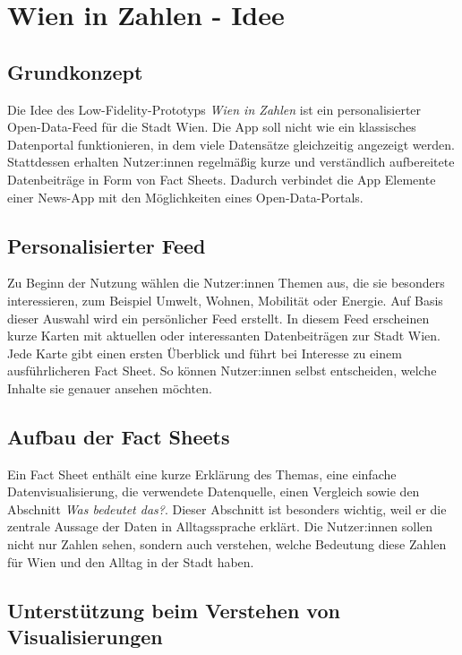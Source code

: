 \section{Wien in Zahlen - Idee}

\subsection{Grundkonzept}

Die Idee des Low-Fidelity-Prototyps \textit{Wien in Zahlen} ist ein personalisierter Open-Data-Feed für die Stadt Wien. Die App soll nicht wie ein klassisches Datenportal funktionieren, in dem viele Datensätze gleichzeitig angezeigt werden. Stattdessen erhalten Nutzer:innen regelmäßig kurze und verständlich aufbereitete Datenbeiträge in Form von Fact Sheets. Dadurch verbindet die App Elemente einer News-App mit den Möglichkeiten eines Open-Data-Portals.

\subsection{Personalisierter Feed}

Zu Beginn der Nutzung wählen die Nutzer:innen Themen aus, die sie besonders interessieren, zum Beispiel Umwelt, Wohnen, Mobilität oder Energie. Auf Basis dieser Auswahl wird ein persönlicher Feed erstellt. In diesem Feed erscheinen kurze Karten mit aktuellen oder interessanten Datenbeiträgen zur Stadt Wien. Jede Karte gibt einen ersten Überblick und führt bei Interesse zu einem ausführlicheren Fact Sheet. So können Nutzer:innen selbst entscheiden, welche Inhalte sie genauer ansehen möchten.

\subsection{Aufbau der Fact Sheets}

Ein Fact Sheet enthält eine kurze Erklärung des Themas, eine einfache Datenvisualisierung, die verwendete Datenquelle, einen Vergleich sowie den Abschnitt \textit{Was bedeutet das?}. Dieser Abschnitt ist besonders wichtig, weil er die zentrale Aussage der Daten in Alltagssprache erklärt. Die Nutzer:innen sollen nicht nur Zahlen sehen, sondern auch verstehen, welche Bedeutung diese Zahlen für Wien und den Alltag in der Stadt haben.

\subsection{Unterstützung beim Verstehen von Visualisierungen}

